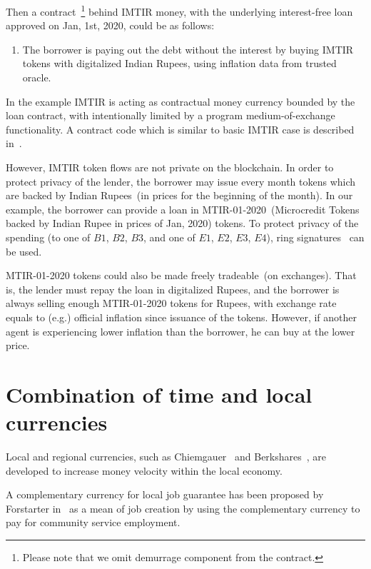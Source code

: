 \documentclass[]{llncs}   %
\begin{document}
  Then a contract~\footnote{Please note that we omit demurrage component from
 the contract.} behind IMTIR money, with the underlying interest-free loan approved on Jan, 1st, 2020,
 could be as follows:

 \begin{enumerate}
        \item{} The borrower is paying out the debt without the interest by buying IMTIR tokens with digitalized Indian 
    Rupees, using inflation data from trusted oracle.
 \end{enumerate}

 
 In the example IMTIR is acting as contractual money currency bounded by the loan contract, with intentionally limited by a
 program medium-of-exchange functionality. A contract code which is similar to basic IMTIR case is described in~\cite{scpeople}.

 However, IMTIR token flows are not private on the blockchain. In order to protect privacy of the lender, the borrower
 may issue every month tokens which are backed by Indian Rupees~(in prices for the beginning of the month). In our example, the
 borrower can provide a loan in MTIR-01-2020~(Microcredit Tokens backed by Indian Rupee in prices of
 Jan, 2020) tokens. To protect privacy of the spending (to one of $B1$, $B2$, $B3$, and one of $E1$, $E2$, $E3$, $E4$), ring
 signatures~\cite{rivest2001leak} can be used.

 MTIR-01-2020 tokens could also be made freely tradeable~(on exchanges). That is, the lender must repay the loan in
 digitalized Rupees, and the borrower is always selling enough MTIR-01-2020 tokens for Rupees, with exchange rate equals
 to (e.g.) official inflation since issuance of the tokens. However, if another agent is experiencing lower inflation
 than the borrower, he can buy at the lower price.

\section{Combination of time and local currencies}
\label{sec-combination}

Local and regional currencies, such as Chiemgauer~\cite{thiel2011complementary} and Berkshares~\cite{swann1995local}, are developed to increase money velocity within the local economy.

A complementary currency for local job guarantee has been proposed by Forstarter in~\cite{forstater2018complementary} as a mean
of job creation by using the complementary currency to pay for community service employment.
\end{document}

